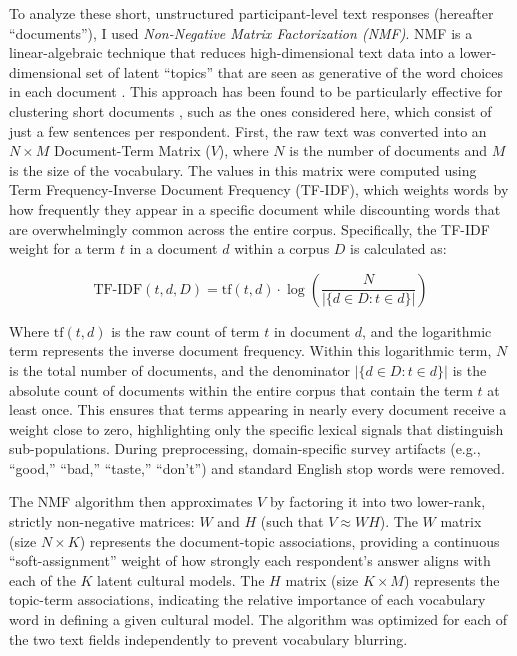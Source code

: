 \documentclass[12pt,letterpaper]{article}
\begin{document}
To analyze these short, unstructured participant-level text responses (hereafter ``documents''), I used \textit{Non-Negative Matrix Factorization (NMF)}. NMF is a linear-algebraic technique that reduces high-dimensional text data into a lower-dimensional set of latent ``topics'' that are seen as generative of the word choices in each document \citep{pauca2004text, xu2003document}. This approach has been found to be particularly effective for clustering short documents \citep{yan2013learning, shi2018short}, such as the ones considered here, which consist of just a few sentences per respondent. First, the raw text was converted into an $N \times M$ Document-Term Matrix ($V$), where $N$ is the number of documents and $M$ is the size of the vocabulary. The values in this matrix were computed using Term Frequency-Inverse Document Frequency (TF-IDF), which weights words by how frequently they appear in a specific document while discounting words that are overwhelmingly common across the entire corpus. Specifically, the TF-IDF weight for a term $t$ in a document $d$ within a corpus $D$ is calculated as:

\begin{equation}
\text{TF-IDF}(t, d, D) = \text{tf}(t, d) \cdot \log\left(\frac{N}{|\{d \in D : t \in d\}|}\right)
\end{equation}

Where $\text{tf}(t, d)$ is the raw count of term $t$ in document $d$, and the logarithmic term represents the inverse document frequency. Within this logarithmic term, $N$ is the total number of documents, and the denominator $|\{d \in D : t \in d\}|$ is the absolute count of documents within the entire corpus that contain the term $t$ at least once. This ensures that terms appearing in nearly every document receive a weight close to zero, highlighting only the specific lexical signals that distinguish sub-populations. During preprocessing, domain-specific survey artifacts (e.g., ``good,'' ``bad,'' ``taste,'' ``don't'') and standard English stop words were removed. 

The NMF algorithm then approximates $V$ by factoring it into two lower-rank, strictly non-negative matrices: $W$ and $H$ (such that $V \approx WH$). The $W$ matrix (size $N \times K$) represents the document-topic associations, providing a continuous ``soft-assignment'' weight of how strongly each respondent's answer aligns with each of the $K$ latent cultural models. The $H$ matrix (size $K \times M$) represents the topic-term associations, indicating the relative importance of each vocabulary word in defining a given cultural model. The algorithm was optimized for each of the two text fields independently to prevent vocabulary blurring. 
\end{document}
